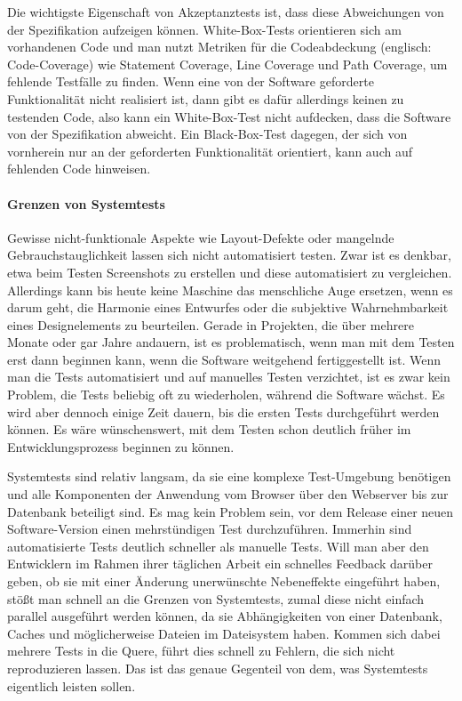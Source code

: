 Die wichtigste Eigenschaft von Akzeptanztests ist, dass diese Abweichungen von der 
Spezifikation aufzeigen können. White-Box-Tests orientieren sich am vorhandenen Code und
man nutzt Metriken für die Codeabdeckung (englisch: Code-Coverage) wie Statement Coverage,
Line Coverage und Path Coverage, um fehlende Testfälle zu finden. Wenn eine von
der Software geforderte Funktionalität nicht realisiert ist, dann gibt es dafür allerdings
keinen zu testenden Code, also kann ein White-Box-Test nicht aufdecken, dass die Software
von der Spezifikation abweicht. Ein Black-Box-Test dagegen, der sich von vornherein nur
an der geforderten Funktionalität orientiert, kann auch auf fehlenden Code hinweisen.

\paragraph{Grenzen von Systemtests}
Gewisse nicht-funktionale Aspekte wie Layout-Defekte oder mangelnde Gebrauchstauglichkeit 
lassen sich nicht automatisiert testen. Zwar ist es denkbar, etwa beim Testen
Screenshots zu erstellen und diese automatisiert zu vergleichen. Allerdings kann bis heute
keine Maschine das menschliche Auge ersetzen, wenn es darum geht, die Harmonie eines
Entwurfes oder die subjektive Wahrnehmbarkeit eines Designelements zu beurteilen.
Gerade in Projekten, die über mehrere Monate oder gar Jahre andauern, ist es problematisch,
wenn man mit dem Testen erst dann beginnen kann, wenn die Software weitgehend
fertiggestellt ist. Wenn man die Tests automatisiert und auf manuelles Testen verzichtet, ist
es zwar kein Problem, die Tests beliebig oft zu wiederholen, während die Software wächst.
Es wird aber dennoch einige Zeit dauern, bis die ersten Tests durchgeführt werden können.
Es wäre wünschenswert, mit dem Testen schon deutlich früher im Entwicklungsprozess
beginnen zu können.

Systemtests sind relativ langsam, da sie eine komplexe Test-Umgebung benötigen und alle
Komponenten der Anwendung vom Browser über den Webserver bis zur Datenbank beteiligt sind.
Es mag kein Problem sein, vor dem Release einer neuen Software-Version einen
mehrstündigen Test durchzuführen. Immerhin sind automatisierte Tests deutlich schneller
als manuelle Tests. Will man aber den Entwicklern im Rahmen ihrer täglichen Arbeit ein
schnelles Feedback darüber geben, ob sie mit einer Änderung unerwünschte Nebeneffekte
eingeführt haben, stößt man schnell an die Grenzen von Systemtests, zumal diese nicht
einfach parallel ausgeführt werden können, da sie Abhängigkeiten von einer Datenbank,
Caches und möglicherweise Dateien im Dateisystem haben. Kommen sich dabei mehrere
Tests in die Quere, führt dies schnell zu Fehlern, die sich nicht reproduzieren lassen. Das
ist das genaue Gegenteil von dem, was Systemtests eigentlich leisten sollen.

